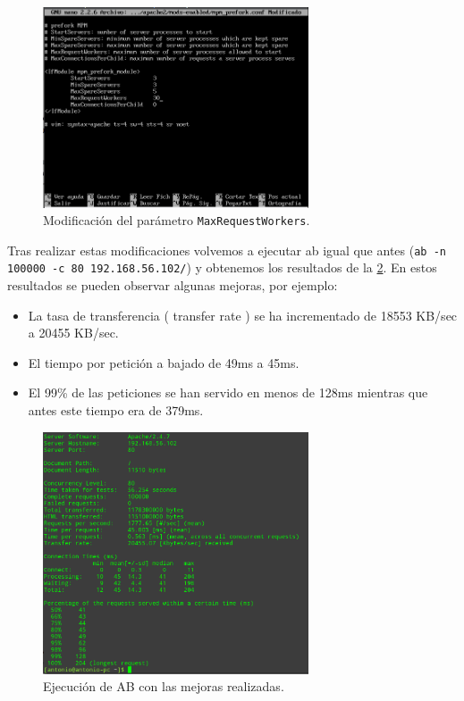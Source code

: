 \begin{figure}[H]
  \begin{center}
    \includegraphics[width=0.7\textwidth]{imagenes/14}
    \caption{Modificación del parámetro \texttt{MaxRequestWorkers}.}
    \label{fig14}
  \end{center}
\end{figure}

Tras realizar estas modificaciones volvemos a ejecutar ab igual que antes (\texttt{ab -n 100000 -c 80 192.168.56.102/}) y obtenemos los resultados de la \cref{fig15}. En estos resultados se pueden observar algunas mejoras, por ejemplo:
\begin{itemize}
    \item La tasa de transferencia ( transfer rate ) se ha incrementado de 18553 KB/sec a 20455 KB/sec.
    \item El tiempo por petición a bajado de 49ms a 45ms.
    \item El 99\% de las peticiones se han servido en menos de 128ms mientras que antes este tiempo era de 379ms.
\end{itemize}

\begin{figure}[H]
  \begin{center}
    \includegraphics[width=0.7\textwidth]{imagenes/15}
    \caption{Ejecución de AB con las mejoras realizadas.}
    \label{fig15}
  \end{center}
\end{figure}

\newpage




